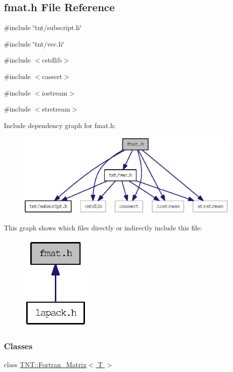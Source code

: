 \subsection{fmat.h File Reference}
\label{fmat_8h}
{\ttfamily \#include \char`\"{}tnt/subscript.h\char`\"{}}\par
{\ttfamily \#include \char`\"{}tnt/vec.h\char`\"{}}\par
{\ttfamily \#include $<$cstdlib$>$}\par
{\ttfamily \#include $<$cassert$>$}\par
{\ttfamily \#include $<$iostream$>$}\par
{\ttfamily \#include $<$strstream$>$}\par
Include dependency graph for fmat.h:
\nopagebreak
\begin{figure}[H]
\begin{center}
\leavevmode
\includegraphics[width=400pt]{fmat_8h__incl}
\end{center}
\end{figure}
This graph shows which files directly or indirectly include this file:
\nopagebreak
\begin{figure}[H]
\begin{center}
\leavevmode
\includegraphics[width=100pt]{fmat_8h__dep__incl}
\end{center}
\end{figure}
\subsubsection*{Classes}
\begin{DoxyCompactItemize}
\item 
class \hyperlink{class_t_n_t_1_1_fortran___matrix}{TNT::Fortran\_\-Matrix$<$ T $>$}
\end{DoxyCompactItemize}
